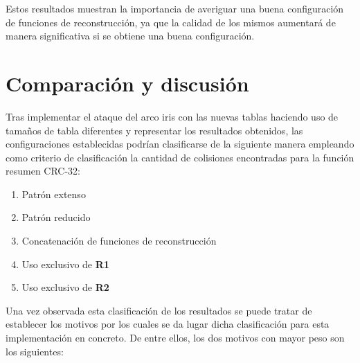 \documentclass[12pt,spanish,listoffigures,listoftables,listofalgorithms]{tfgetsinf}
\begin{document}
Estos resultados muestran la importancia de averiguar una buena configuración de funciones de reconstrucción, ya que la calidad de los mismos aumentará de manera significativa si se obtiene una buena configuración.

\section{Comparación y discusión}\label{discusión}


Tras implementar el ataque del arco iris con las nuevas tablas haciendo uso de tamaños de tabla diferentes y representar los resultados obtenidos, las configuraciones establecidas podrían clasificarse de la siguiente manera empleando como criterio de clasificación la cantidad de colisiones encontradas para la función resumen CRC-32:

\begin{enumerate}

    \item Patrón extenso

    \item Patrón reducido
    
    \item Concatenación de funciones de reconstrucción
    
    \item Uso exclusivo de \textbf{R1}
    
    \item Uso exclusivo de \textbf{R2}
    
\end{enumerate}


Una vez observada esta clasificación de los resultados se puede tratar de establecer los motivos por los cuales se da lugar dicha clasificación para esta implementación en concreto. De entre ellos, los dos motivos con mayor peso son los siguientes:
\end{document}
